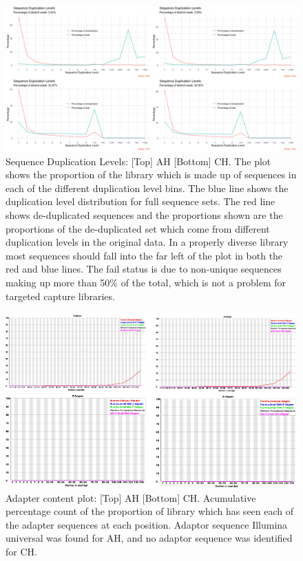 \documentclass{article}
\begin{document}
\begin{figure}[h] \hspace*{0cm} 
\begin{center}
    \includegraphics[scale=0.35]{fastqcr/p5}
	\caption{Sequence Duplication Levels:  [Top] AH [Bottom] CH.
	The plot shows the proportion of the library which is made up of sequences in each of the different duplication level bins. 
	The blue line shows the duplication level distribution for full sequence sets. 
	The red line shows de-duplicated sequences and the proportions shown are the proportions of the de-duplicated set which come from different duplication levels in the original data.
In a properly diverse library most sequences should fall into the far left of the plot in both the red and blue lines.
The fail status is due to non-unique sequences making up more than 50\% of the total, which is not a problem for targeted capture libraries.}
	\label{fig:p5}
\end{center}
\end{figure}

\begin{figure}[h] \hspace*{0cm} 
\begin{center}
    \includegraphics[scale=0.45]{fastqc/p6}
	\caption{Adapter content plot:  [Top] AH [Bottom] CH. Acumulative percentage count of the proportion of library which has seen each of the adapter sequences at each position. Adaptor sequence Illumina universal was found for AH, and no adaptor sequence was identified for CH. }
	\label{fig:p6}
\end{center}
\end{figure}
\end{document}
